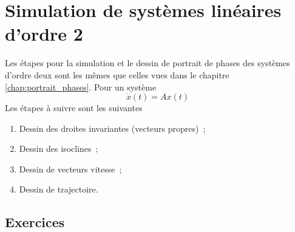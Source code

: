     \section{Simulation de systèmes linéaires d'ordre 2}
        Les étapes pour la simulation et le dessin de portrait de phases des systèmes d'ordre deux sont les mêmes que celles vues dans le chapitre \ref{chap:portrait_phases}. Pour un système
        \begin{equation*}
            \dot x(t) = A x(t)
        \end{equation*}
        Les étapes à suivre sont les suivantes
        \begin{enumerate}
            \item Dessin des droites invariantes (vecteurs propres)~;
            \item Dessin des isoclines~;
            \item Dessin de vecteurs vitesse~;
            \item Dessin de trajectoire.
        \end{enumerate}
        \subsection{Exercices}
